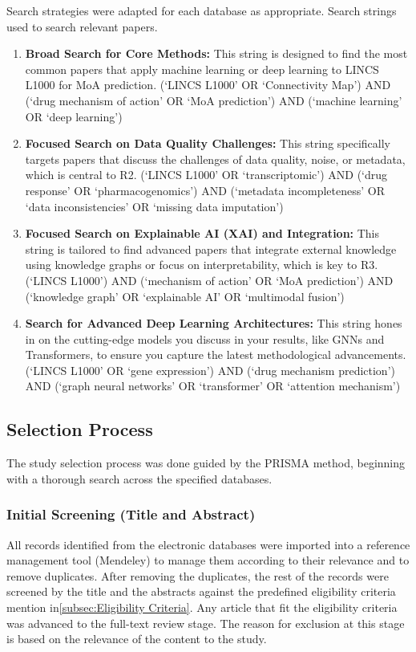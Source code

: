 \documentclass[twocolumn]{article}
\begin{document}
Search strategies were adapted for each database as appropriate.
Search strings used to search relevant papers.
\begin{enumerate}
    \item \textbf{Broad Search for Core Methods:} This string is designed to find the most common papers that apply machine learning or deep learning to LINCS L1000 for MoA prediction.
    (`LINCS L1000' OR `Connectivity Map') AND (`drug mechanism of action' OR `MoA prediction') AND (`machine learning' OR `deep learning')
    \item \textbf{Focused Search on Data Quality Challenges:} This string specifically targets papers that discuss the challenges of data quality, noise, or metadata, which is central to R2.
    (`LINCS L1000' OR `transcriptomic') AND (`drug response' OR `pharmacogenomics') AND (`metadata incompleteness' OR `data inconsistencies' OR `missing data imputation')
    \item \textbf{Focused Search on Explainable AI (XAI) and Integration:} This string is tailored to find advanced papers that integrate external knowledge using knowledge graphs or focus on interpretability, which is key to R3.
    (`LINCS L1000') AND (`mechanism of action' OR `MoA prediction') AND (`knowledge graph' OR `explainable AI' OR `multimodal fusion')
    \item \textbf{Search for Advanced Deep Learning Architectures:} This string hones in on the cutting-edge models you discuss in your results, like GNNs and Transformers, to ensure you capture the latest methodological advancements.
    (`LINCS L1000' OR `gene expression') AND (`drug mechanism prediction') AND (`graph neural networks' OR `transformer' OR `attention mechanism')
\end{enumerate}

\subsection{Selection Process}
The study selection process was done guided by the PRISMA method, beginning with a thorough search across the specified databases.
\\
\subsubsection{Initial Screening (Title and Abstract)}
All records identified from the electronic databases were imported into a reference management tool (Mendeley) to manage them according to their relevance and to remove duplicates. After removing the duplicates, the rest of the records were screened by the title and the abstracts against the predefined eligibility criteria mention in\ref{subsec:Eligibility Criteria}. Any article that fit the eligibility criteria was advanced to the full-text review stage. The reason for exclusion at this stage is based on the relevance of the content to the study.
\end{document}

